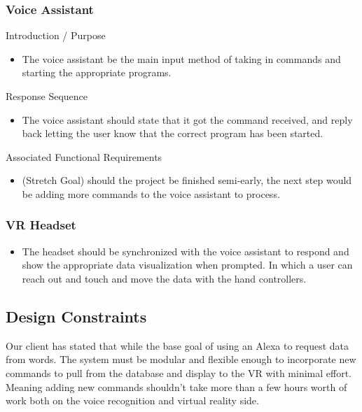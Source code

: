 \documentclass[onecolumn, draftclsnofoot,10pt, compsoc]{IEEEtran}
\begin{document}
        \subsubsection{Voice Assistant}
            Introduction / Purpose
            \begin{itemize}
                \item The voice assistant be the main input method of taking in commands and starting the appropriate programs.
            \end{itemize}
            Response Sequence
            \begin{itemize}
                \item The voice assistant should state that it got the command received, and reply back letting the user know that the correct program has been started.
            \end{itemize}
            Associated Functional Requirements
            \begin{itemize}
                \item (Stretch Goal) should the project be finished semi-early, the next step would be adding more commands to the voice assistant to process. 

            \end{itemize}
        \subsubsection{VR Headset}
            \begin{itemize}
                    \item The headset should be synchronized with the voice assistant to respond and show the appropriate data visualization when prompted. In which a user can reach out and touch and move the data with the hand controllers. 
            \end{itemize}
    
    \subsection{Design Constraints}
        Our client has stated that while the base goal of using an Alexa to request data from words. The system must be modular and flexible enough to incorporate new commands to pull from the database and display to the VR with minimal effort. Meaning adding new commands shouldn’t take more than a few hours worth of work both on the voice recognition and virtual reality side. 
\end{document}
